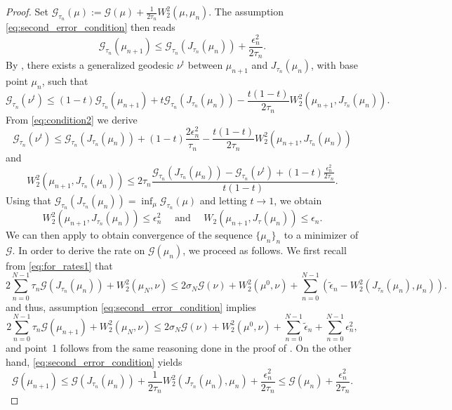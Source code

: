 \documentclass[11pt]{article}
\newcommand{\cG}{\mathcal{G}}
\numberwithin{equation}{section}
\begin{document}
\begin{proof}
	Set $\cG_{{\tau_n}}(\mu):= \cG(\mu)+\frac{1}{2{\tau_n}}W_2^2(\mu,\mu_n)$. The assumption \eqref{eq:second_error_condition} then reads
	\begin{equation}\label{eq:condition2}
		\cG_{{\tau_n}}(\mu_{n+1})\leq \cG_{\tau_n}(J_{{\tau_n}} (\mu_n)) +\frac{\epsilon_n^2}{2\tau_n}.
	\end{equation}
	By \cite[Lemma 9.2.7]{AGS08}, there exists a generalized geodesic $\nu^t$ between $\mu_{n+1}$ and $J_{{\tau_n}}(\mu_n)$, with base point $\mu_n$, such that
	\[\cG_{\tau_n} (\nu^t)\leq (1-t)\cG_{\tau_n} (\mu_{n+1})+t\cG_{\tau_n} (J_{{\tau_n}}(\mu_n))-\frac{ t(1-t)}{2{\tau_n}}W_2^2(\mu_{n+1},J_{{\tau_n}}(\mu_n)).\] 
	From \eqref{eq:condition2} we derive
	\[\cG_{\tau_n} (\nu^t)\leq \cG_{\tau_n} (J_{{\tau_n}}(\mu_n))+(1-t)\frac{2\epsilon_n^2}{{\tau_n}}-\frac{t(1-t)}{2{\tau_n}}W_2^2(\mu_{n+1},J_{{\tau_n}}(\mu_n))\]
	and
	\[W_2^2(\mu_{n+1},J_{{\tau_n}}(\mu_n)) \leq 2{\tau_n} \frac{\cG_{\tau_n} (J_{{\tau_n}}(\mu_n))-\cG_{\tau_n} (\nu^t)+(1-t)\frac{\epsilon_n^2}{2\tau_n}}{t(1-t)}.\]
	Using that $\cG_{\tau_n}(J_{{\tau_n}}(\mu_n))= \inf_\mu \cG_{\tau_n}(\mu)$ and letting $t\to 1$, we obtain
	\[W_2^2(\mu_{n+1},J_{{\tau_n}}(\mu_n))\leq \epsilon_n^2 \quad \text{ and }\quad W_2(\mu_{n+1},J_{\tau}(\mu_n))\leq \epsilon_n.\]
	We can then apply  to obtain convergence of the sequence $\{\mu_n\}_n$ to a minimizer of $\cG$. In order to derive the rate on $\cG(\mu_n)$, we proceed as follows. We first recall from \eqref{eq:for_rates1} that
	\begin{equation}\label{eq:err2_for_rates1}
		2\sum_{n=0}^{N-1}\tau_n\cG(J_{\tau_n}(\mu_n))+W_2^2(\mu_N,\nu)\leq 2\sigma_N \cG(\nu)+W_2^2(\mu^0,\nu)+\sum_{n=0}^{N-1}(\tilde{\epsilon}_n-W_2^2(J_{\tau_n}(\mu_n),\mu_n)).
	\end{equation}
	and thus, assumption \eqref{eq:second_error_condition} implies
	\begin{equation}\label{eq:err2_for_rates2}
		2\sum_{n=0}^{N-1}\tau_n\cG(\mu_{n+1})+W_2^2(\mu_N,\nu)\leq 2\sigma_N \cG(\nu)+W_2^2(\mu^0,\nu)+\sum_{n=0}^{N-1}\tilde{\epsilon}_n+ \sum_{n=0}^{N-1}\epsilon_n^2,
	\end{equation}
	and point~1 follows from the same reasoning done in the proof of . On the other hand, \eqref{eq:second_error_condition} yields
	\[\mathcal{G}(\mu_{n+1})\leq \cG(J_{{\tau_n}}(\mu_n))+\frac{1}{2\tau_n}W_2^2(J_{\tau_n}(\mu_n),\mu_n)+ \frac{\epsilon_n^2}{2\tau_n}\leq  \mathcal{G}(\mu_n)+\frac{\epsilon_n^2}{2\tau_n}.\]

\end{proof}
\end{document}
